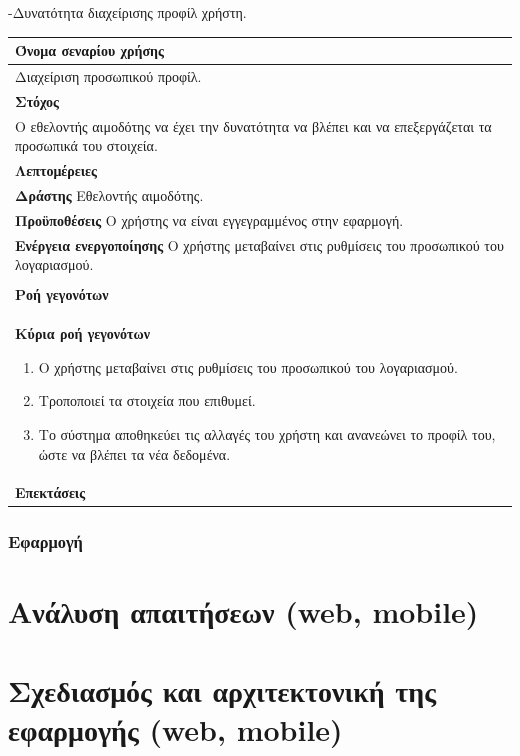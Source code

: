 -Δυνατότητα διαχείρισης προφίλ χρήστη.

 \begin{center}
    \begin{tabular}{|p{\dimexpr \linewidth-2\tabcolsep}|}
    \hline
    \rowcolor{grayy}
    \textbf{Όνομα σεναρίου χρήσης}
    \\ \hline    
    Διαχείριση προσωπικού προφίλ. 
     \\ \hline
    \rowcolor{grayy}
    \textbf{\textbf{Στόχος}}
    \\ \hline
 	 Ο εθελοντής αιμοδότης να έχει την δυνατότητα να βλέπει και να επεξεργάζεται τα προσωπικά του στοιχεία.
    \\ \hline
    \rowcolor{grayy}
    \textbf{Λεπτομέρειες}
    \\ \hline
	\textbf{Δράστης} Εθελοντής αιμοδότης.
	\\*
	\textbf{Προϋποθέσεις} Ο χρήστης να είναι εγγεγραμμένος στην εφαρμογή.
	\\*
	\textbf{Ενέργεια ενεργοποίησης} Ο χρήστης μεταβαίνει στις ρυθμίσεις του προσωπικού του λογαριασμού.
	\\ \hline
    \\ \hline
	\rowcolor{grayy}    
    \textbf{Ροή γεγονότων}
    \\* 
	\textbf{Κύρια ροή γεγονότων}
	\begin{enumerate}
	\item	 Ο χρήστης μεταβαίνει στις ρυθμίσεις του προσωπικού του λογαριασμού.
	\item Τροποποιεί τα στοιχεία που επιθυμεί.
   \item Το σύστημα αποθηκεύει τις αλλαγές του χρήστη και ανανεώνει το προφίλ του, ώστε να βλέπει τα νέα δεδομένα.
	\end{enumerate}
	\\*
	\textbf{Επεκτάσεις}
	   \\ \hline
    \end{tabular}
\end{center}	

 \subsubsection{Εφαρμογή}

\section{Ανάλυση απαιτήσεων (web, mobile)}
\section{Σχεδιασμός και αρχιτεκτονική της εφαρμογής (web, mobile)}
